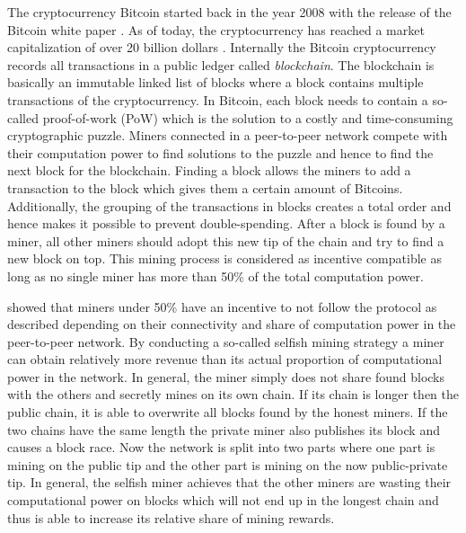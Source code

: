 
The cryptocurrency Bitcoin started back in the year 2008 with the release of the Bitcoin white paper \cite{nakamoto2008bitcoin}.
As of today, the cryptocurrency has reached a market capitalization of over 20 billion dollars \cite{marketcap2017}.
Internally the Bitcoin cryptocurrency records all transactions in a public ledger called \emph{blockchain}.
The blockchain is basically an immutable linked list of blocks where a block contains multiple transactions of the cryptocurrency.
In Bitcoin, each block needs to contain a so-called proof-of-work (PoW) which is the solution to a costly and time-consuming cryptographic puzzle.
Miners connected in a peer-to-peer network compete with their computation power to find solutions to the puzzle and hence to find the next block for the blockchain.
Finding a block allows the miners to add a transaction to the block which gives them a certain amount of Bitcoins.
Additionally, the grouping of the transactions in blocks creates a total order and hence makes it possible to prevent double-spending.
After a block is found by a miner, all other miners should adopt this new tip of the chain and try to find a new block on top.
This mining process is considered as incentive compatible as long as no single miner has more than 50\% of the total computation power.

\cite{eyal2014majority} showed that miners under 50\% have an incentive to not follow the protocol as described depending on their connectivity and share of computation power in the peer-to-peer network.
By conducting a so-called selfish mining strategy a miner can obtain relatively more revenue than its actual proportion of computational power in the network.
In general, the miner simply does not share found blocks with the others and secretly mines on its own chain.
If its chain is longer then the public chain, it is able to overwrite all blocks found by the honest miners.
If the two chains have the same length the private miner also publishes its block and causes a block race.
Now the network is split into two parts where one part is mining on the public tip and the other part is mining on the now public-private tip.
In general, the selfish miner achieves that the other miners are wasting their computational power on blocks which will not end up in the longest chain and thus is able to increase its relative share of mining rewards.

